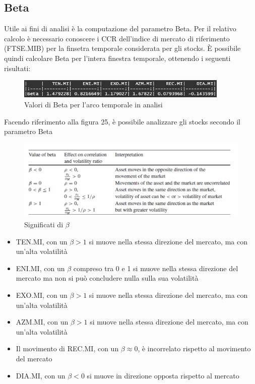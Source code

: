 \documentclass[12pt]{article}
\begin{document}
\subsection{Beta}
Utile ai fini di analisi è la computazione del parametro Beta. Per il relativo calcolo è necessario conoscere i CCR dell'indice di mercato di riferimento (FTSE.MIB) per la finsetra temporale considerata per gli stocks. È possibile quindi calcolare Beta per l'intera finestra temporale, ottenendo i seguenti risultati:
\begin{figure}[!htb]
    \centering
    \includegraphics[width=0.9\textwidth]{immagini/beta20182020.png}
    \caption{Valori di Beta per l'arco temporale in analisi}
\end{figure}
\FloatBarrier
Facendo riferimento alla figura 25, è possibile analizzare gli stocks secondo il parametro Beta
\begin{figure}[!htb]
    \centering
    \includegraphics[width=1\textwidth]{immagini/beta.png}
    \caption{Significati di $\beta$}
\end{figure}
\FloatBarrier
\begin{itemize}
    \item TEN.MI, con un $\beta > 1$ si muove nella stessa direzione del mercato, ma con un'alta volatilità
    \item ENI.MI, con un $\beta$ compreso tra 0 e 1 si muove nella stessa direzione del mercato ma non si può concludere nulla sulla sua volatilità
    \item EXO.MI, con un $\beta > 1$ si muove nella stessa direzione del mercato, ma con un'alta volatilità
    \item AZM.MI, con un $\beta > 1$ si muove nella stessa direzione del mercato, ma con un'alta volatilità
    \item Il movimento di REC.MI, con un $\beta \approx 0$, è incorrelato rispetto al movimento del mercato
    \item DIA.MI, con un $\beta < 0$ si muove in direzione opposta rispetto al mercato
\end{itemize}
\end{document}
